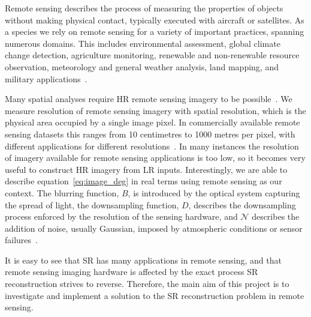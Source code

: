 Remote sensing describes the process of measuring the properties of objects without making physical contact, typically executed with aircraft or satellites. As a species we rely on remote sensing for a variety of important practices, spanning numerous domains. This includes environmental assessment, global climate change detection, agriculture monitoring, renewable and non-renewable resource observation, meteorology and general weather analysis, land mapping, and military applications~\cite{remoteSensingImageProcessing, remoteSensingUses, remoteSensingGANsReview}.

Many spatial analyses require HR remote sensing imagery to be possible~\cite{urbanMapping}. We measure resolution of remote sensing imagery with spatial resolution, which is the physical area occupied by a single image pixel. In commercially available remote sensing datasets this ranges from 10 centimetres to 1000 metres per pixel, with different applications for different resolutions~\cite{remoteSensingImageProcessing}. In many instances the resolution of imagery available for remote sensing applications is too low, so it becomes very useful to construct HR imagery from LR inputs. Interestingly, we are able to describe equation~\ref{eq:image_deg} in real terms using remote sensing as our context. The blurring function, $B$, is introduced by the optical system capturing the spread of light, the downsampling function, $D$, describes the downsampling process enforced by the resolution of the sensing hardware, and $\mathcal{N}$ describes the addition of noise, usually Gaussian, imposed by atmospheric conditions or sensor failures~\cite{superResRemoteSensingOverview,superResRemoteSensingChallenges, remoteSensingDeepLearningReview, remoteSensingGANsReview}.

It is easy to see that SR has many applications in remote sensing, and that remote sensing imaging hardware is affected by the exact process SR reconstruction strives to reverse. Therefore, the main aim of this project is to investigate and implement a solution to the SR reconstruction problem in remote sensing.

